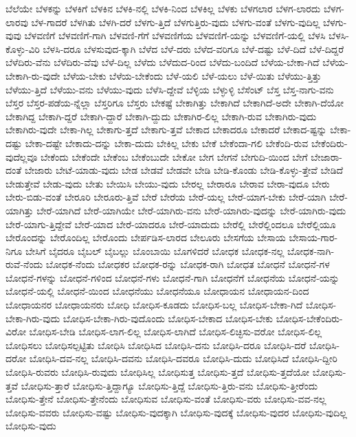 {ಬೆಲೆಯೇ
ಬೆಳಕನ್ನು
ಬೆಳಕಿಗೆ
ಬೆಳಕಿನ
ಬೆಳಕಿ-ನಲ್ಲಿ
ಬೆಳಕಿ-ನಿಂದ
ಬೆಳಕಿಲ್ಲ
ಬೆಳಕು
ಬೆಳಗಲಾರ
ಬೆಳಗ-ಲಾರದು
ಬೆಳಗ-ಲಾರವು
ಬೆಳ-ಗಾದರೆ
ಬೆಳಗಿತು
ಬೆಳಗಿ-ದರೆ
ಬೆಳಗು-ತ್ತಿದೆ
ಬೆಳಗುತ್ತಿರು-ವುದು
ಬೆಳಗು-ವಂತೆ
ಬೆಳಗು-ವುದಿಲ್ಲ
ಬೆಳಗು-ವುವು
ಬೆಳವಣಿಗೆ
ಬೆಳವಣಿಗೆ-ಗಾಗಿ
ಬೆಳವಣಿ-ಗೆಗೆ
ಬೆಳವಣಿಗೆಯ
ಬೆಳವಣಿಗೆ-ಯನ್ನು
ಬೆಳವಣಿಗೆ-ಯಲ್ಲಿ
ಬೆಳಸಿ
ಬೆಳಸಿ-ಕೊಳ್ಳು-ವಿರಿ
ಬೆಳಸಿ-ದರೂ
ಬೆಳಸುವುದ-ಕ್ಕಾಗಿ
ಬೆಳೆದ
ಬೆಳೆ-ದರು
ಬೆಳೆದ-ವರಿಗೂ
ಬೆಳೆ-ದಷ್ಟು
ಬೆಳೆ-ದಿದೆ
ಬೆಳೆ-ದಿದ್ದರೆ
ಬೆಳೆದಿರು-ವೆನು
ಬೆಳೆದಿರು-ವೆವು
ಬೆಳೆ-ದಿಲ್ಲ
ಬೆಳೆದು
ಬೆಳೆದುದ-ರಿಂದ
ಬೆಳೆದು-ಬಂದಿದೆ
ಬೆಳೆಯ-ಬೇಕಾ-ಗಿದೆ
ಬೆಳೆಯ-ಬೇಕಾಗಿ-ರು-ವುದೇ
ಬೆಳೆಯ-ಬೇಕು
ಬೆಳೆಯ-ಬೇಕೆಂದು
ಬೆಳೆ-ಯಲಿ
ಬೆಳೆ-ಯಲು
ಬೆಳೆ-ಯಿತು
ಬೆಳೆಯು-ತ್ತಿತ್ತು
ಬೆಳೆಯು-ತ್ತಿದೆ
ಬೆಳೆಯು-ವನು
ಬೆಳೆಯು-ವುದು
ಬೆಳೆಸಿ-ದ್ದೇವೆ
ಬೆಳ್ಳಿಯ
ಬೆಳ್ಳುಳ್ಳಿ
ಬೆಸೆಂಟ್
ಬೆಸ್ತ
ಬೆಸ್ತ-ನಾಗು-ವನು
ಬೆಸ್ತರ
ಬೆಸ್ತರ-ಪಡೆಯ-ನ್ನೆಲ್ಲಾ
ಬೆಸ್ತರಿಗೂ
ಬೆಸ್ತರು
ಬೇಕಷ್ಟೆ
ಬೇಕಾಗಿತ್ತು
ಬೇಕಾಗಿದೆ
ಬೇಕಾಗಿದೆ-ಅದೇ
ಬೇಕಾಗಿ-ದೆಯೋ
ಬೇಕಾಗಿದ್ದ
ಬೇಕಾಗಿ-ದ್ದರೆ
ಬೇಕಾಗಿ-ದ್ದಾರೆ
ಬೇಕಾಗಿ-ದ್ದುದು
ಬೇಕಾಗಿರ-ಲಿಲ್ಲ
ಬೇಕಾಗಿ-ರುವ
ಬೇಕಾಗಿರು-ವುದು
ಬೇಕಾಗಿರು-ವುದೇ
ಬೇಕಾ-ಗಿಲ್ಲ
ಬೇಕಾಗು-ತ್ತದೆ
ಬೇಕಾಗು-ತ್ತವೆ
ಬೇಕಾದ
ಬೇಕಾದರೂ
ಬೇಕಾದರೆ
ಬೇಕಾದ-ಷ್ಟನ್ನು
ಬೇಕಾ-ದಷ್ಟು
ಬೇಕಾ-ದಷ್ಟೇ
ಬೇಕಾದು-ದನ್ನು
ಬೇಕಾ-ದುದು
ಬೇಕಿಲ್ಲ
ಬೇಕು
ಬೇಕೆ
ಬೇಕೆಂದಾ-ಗಲಿ
ಬೇಕೆಂದಿ-ರುವ
ಬೇಕೆಂದಿರು-ವುದೆಲ್ಲವೂ
ಬೇಕೆಂದು
ಬೇಕೆಂದೇ
ಬೇಕೆಂಬ
ಬೇಕೆಂಬುದೇ
ಬೇಕೋ
ಬೇಗ
ಬೇಗನೆ
ಬೇಗುದಿ-ಯಿಂದ
ಬೇಗೆ
ಬೇಜಾರಾ-ದಂತೆ
ಬೇಜಾರು
ಬೇಟೆ-ಯಾಡು-ವುದು
ಬೇಡ
ಬೇಡವೆ
ಬೇಡವೇ
ಬೇಡಿ
ಬೇಡಿ-ಕೊಂಡು
ಬೇಡಿ-ಕೊಳ್ಳು-ತ್ತೇವೆ
ಬೇಡಿದೆ
ಬೇಡುತ್ತೇವೆ
ಬೇಡು-ವುದು
ಬೇತು
ಬೇಯಿಸಿ
ಬೇಯು-ವುದು
ಬೇರಲ್ಲ
ಬೇರಾರೂ
ಬೇರಾವ
ಬೇರಾ-ವುದೂ
ಬೇರು
ಬೇರು-ಬಿಡು-ವಂತೆ
ಬೇರೂರಿ
ಬೇರೂರು-ತ್ತಿವೆ
ಬೇರೆ
ಬೇರೆಯ
ಬೇರೆ-ಯಲ್ಲ
ಬೇರೆ-ಯಾಗ-ಬೇಕು
ಬೇರೆ-ಯಾಗಿ
ಬೇರೆ-ಯಾಗಿತ್ತು
ಬೇರೆ-ಯಾಗಿದೆ
ಬೇರೆ-ಯಾಗಿಯೇ
ಬೇರೆ-ಯಾಗಿರು-ವನು
ಬೇರೆ-ಯಾಗಿರು-ವುದನ್ನು
ಬೇರೆ-ಯಾಗಿರು-ವುದು
ಬೇರೆ-ಯಾಗು-ತ್ತಿದ್ದೇವೆ
ಬೇರೆ-ಯಾದ
ಬೇರೆ-ಯಾದರೂ
ಬೇರೆ-ಯಾದುದು
ಬೇರೆಲ್ಲಿ
ಬೇರೆಲ್ಲಿಂದಲೂ
ಬೇರೆಲ್ಲಿಯೂ
ಬೇರೊಂದನ್ನು
ಬೇರೊಂದಿಲ್ಲ
ಬೇರೊಂದು
ಬೇರ್ಪಡಿಸ-ಲಾರದ
ಬೇಲೂರು
ಬೇಸಗೆಯ
ಬೇಸಾಯ
ಬೇಸಾಯ-ಗಾರ-ನಿಗೂ
ಬೇಸಿಗೆ
ಬೈದರೂ
ಬೈಬಲ್
ಬೈಬಲ್ಲು
ಬೊಂಬಾಯಿ
ಬೊಗಳಿದರೆ
ಬೋಧಕ
ಬೋಧಕ-ನಲ್ಲ
ಬೋಧಕ-ನಾಗಿ-ರುವೆ-ನೆಂದು
ಬೋಧಕ-ನೆಂದು
ಬೋಧಕರ
ಬೋಧಕ-ರನ್ನು
ಬೋಧಕ-ರಾಗಿ
ಬೋಧತ
ಬೋಧನೆ
ಬೋಧನೆ-ಗಳ
ಬೋಧನೆ-ಗಳನ್ನು
ಬೋಧನೆ-ಗಳಿಂದ
ಬೋಧನೆ-ಗಳು
ಬೋಧನೆ-ಗಾಗಿ
ಬೋಧನೆಗೆ
ಬೋಧನೆಯ
ಬೋಧನೆ-ಯನ್ನು
ಬೋಧನೆ-ಯಲ್ಲಿ
ಬೋಧನೆ-ಯಿಂದ
ಬೋಧನೆಯು
ಬೋಧನೆಯೂ
ಬೋಧಾಯನ
ಬೋಧಾಯನ-ದಿಂದ
ಬೋಧಾಯನರ
ಬೋಧಾಯನರು
ಬೋಧಿ
ಬೋಧಿಸ-ಕೂಡದು
ಬೋಧಿಸ-ಬಲ್ಲ
ಬೋಧಿಸ-ಬೇಕಾ-ಗಿದೆ
ಬೋಧಿಸ-ಬೇಕಾ-ಗಿರು-ವುದು
ಬೋಧಿಸ-ಬೇಕಾ-ಗಿರು-ವುದೊಂದು
ಬೋಧಿಸ-ಬೇಕಾದ
ಬೋಧಿಸ-ಬೇಕು
ಬೋಧಿಸ-ಬೇಕೆಂದಿರು-ವಿರೋ
ಬೋಧಿಸ-ಬೇಡಿ
ಬೋಧಿಸ-ಲಾಗ-ಲಿಲ್ಲ
ಬೋಧಿಸ-ಲಾಗಿದೆ
ಬೋಧಿಸ-ಲಿಚ್ಛಿಸು-ವರೋ
ಬೋಧಿಸ-ಲಿಲ್ಲ
ಬೋಧಿಸಲು
ಬೋಧಿಸಲ್ಪಟ್ಟಿತು
ಬೋಧಿಸಿ
ಬೋಧಿಸಿದ
ಬೋಧಿಸಿ-ದನು
ಬೋಧಿಸಿ-ದರೂ
ಬೋಧಿಸಿ-ದರೆ
ಬೋಧಿಸಿ-ದರೋ
ಬೋಧಿಸಿ-ದವ-ನಲ್ಲ
ಬೋಧಿಸಿ-ದವನು
ಬೋಧಿಸಿ-ದವರೂ
ಬೋಧಿಸಿ-ದುದು
ಬೋಧಿಸಿದೆ
ಬೋಧಿಸಿ-ದ್ದೀರಿ
ಬೋಧಿಸಿ-ರುವರು
ಬೋಧಿಸಿ-ರುವುದು
ಬೋಧಿಸಿಲ್ಲ
ಬೋಧಿಸುತ್ತ
ಬೋಧಿಸು-ತ್ತದೆ
ಬೋಧಿಸು-ತ್ತದೆಯೋ
ಬೋಧಿಸು-ತ್ತವೆ
ಬೋಧಿಸು-ತ್ತಾರೆ
ಬೋಧಿಸು-ತ್ತಿದ್ದಾಗ್ಯೂ
ಬೋಧಿಸು-ತ್ತಿದ್ದೆ
ಬೋಧಿಸು-ತ್ತಿರು-ವನು
ಬೋಧಿಸು-ತ್ತೀರೆಂದು
ಬೋಧಿಸು-ತ್ತೇನೆ
ಬೋಧಿಸು-ತ್ತೇನೆಂದು
ಬೋಧಿಸುವ
ಬೋಧಿಸು-ವಂತೆ
ಬೋಧಿಸು-ವರು
ಬೋಧಿಸು-ವವ-ನಲ್ಲ
ಬೋಧಿಸು-ವವರು
ಬೋಧಿಸು-ವಷ್ಟು
ಬೋಧಿಸು-ವುದಕ್ಕಾಗಿ
ಬೋಧಿಸು-ವುದಕ್ಕೆ
ಬೋಧಿಸು-ವುದರ
ಬೋಧಿಸು-ವುದಿಲ್ಲ
ಬೋಧಿಸು-ವುದು
}
